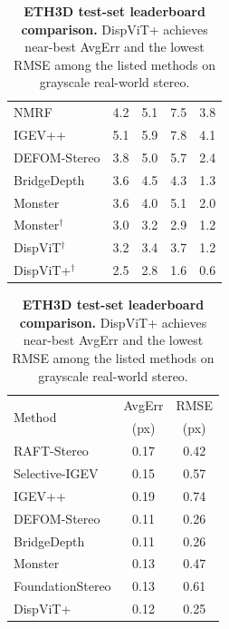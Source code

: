 \begin{table}[!t]
\begin{minipage}{0.59\textwidth}
\begin{tabular}{@{}lcccc@{}}
				NMRF & 4.2 & 5.1 & 7.5 & 3.8\\
				IGEV++ & 5.1 & 5.9 & 7.8 & 4.1 \\
				DEFOM-Stereo & 3.8 & 5.0 & 5.7 & 2.4 \\
				BridgeDepth & 3.6 & 4.5 & 4.3 & 1.3\\
				Monster & 3.6 & 4.0 & 5.1 & 2.0\\
				Monster$^{\dagger}$ & 3.0 & 3.2 & 2.9 & 1.2\\
				\midrule
				DispViT$^{\dagger}$ & 3.2 & 3.4 & 3.7 & 1.2\\
				DispViT+$^{\dagger}$ & 2.5 & 2.8 & 1.6 & 0.6\\
				\bottomrule
			\end{tabular}
				\vspace{-1.2em}
			\end{minipage}
			\hfill
			\begin{minipage}{0.39\textwidth}
				\centering
				\small
				\setlength{\tabcolsep}{4.5pt}
				\renewcommand{\arraystretch}{1.05}
				\caption{\textbf{ETH3D test-set leaderboard comparison.}
				DispViT+ achieves near-best AvgErr and the lowest RMSE among the listed methods on grayscale real-world stereo.}
				\label{tab:eth3d}
				\vspace{2pt}
				\begin{tabular}{@{}lcc@{}}
					\toprule
					\multirow{2}{*}{Method} & AvgErr & RMSE\\
				& (px) & (px)\\
				\midrule
				RAFT-Stereo   &  0.17 & 0.42\\
				Selective-IGEV   & 0.15 & 0.57\\
				IGEV++ & 0.19 & 0.74\\
				DEFOM-Stereo & 0.11 & 0.26\\
				BridgeDepth & 0.11 & 0.26\\
				Monster & 0.13 & 0.47\\
				FoundationStereo & 0.13 & 0.61\\
				\midrule
				DispViT+ & 0.12 & 0.25\\
				\bottomrule
			\end{tabular}
			\end{minipage}
		\end{table}
	
